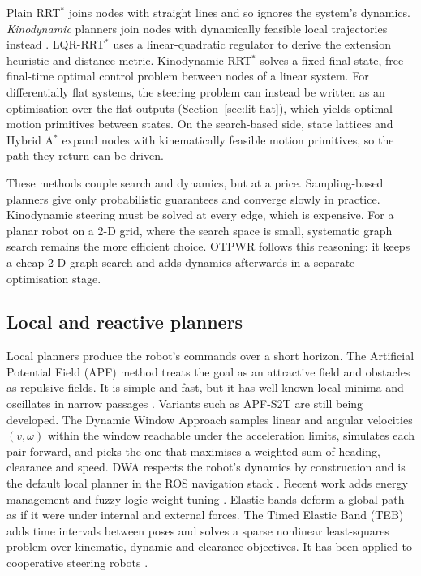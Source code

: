\documentclass[11pt,a4paper]{article}
\begin{document}
Plain RRT$^\ast$ joins nodes with straight lines and so ignores the system's
dynamics. \emph{Kinodynamic} planners join nodes with dynamically feasible
local trajectories instead \citep{lavalle2001randomized}. LQR-RRT$^\ast$
\citep{perez2012lqr} uses a linear-quadratic regulator to derive the
extension heuristic and distance metric. Kinodynamic RRT$^\ast$
\citep{webb2013kinodynamic} solves a fixed-final-state, free-final-time
optimal control problem between nodes of a linear system. For differentially
flat systems, the steering problem can instead be written as an optimisation
over the flat outputs (Section~\ref{sec:lit-flat}), which yields optimal
motion primitives between states. On the search-based side, state lattices
\citep{pivtoraiko2009differentially} and Hybrid A$^\ast$
\citep{dolgov2010path} expand nodes with kinematically feasible motion
primitives, so the path they return can be driven.

These methods couple search and dynamics, but at a price. Sampling-based
planners give only probabilistic guarantees and converge slowly in practice.
Kinodynamic steering must be solved at every edge, which is expensive. For a
planar robot on a 2-D grid, where the search space is small, systematic graph
search remains the more efficient choice. OTPWR follows this reasoning: it
keeps a cheap 2-D graph search and adds dynamics afterwards in a separate
optimisation stage.

\subsection{Local and reactive planners}
\label{sec:lit-local}

Local planners produce the robot's commands over a short horizon. The
Artificial Potential Field (APF) method \citep{khatib1986realtime} treats the
goal as an attractive field and obstacles as repulsive fields. It is simple
and fast, but it has well-known local minima and oscillates in narrow
passages \citep{koren1991potential}. Variants such as APF-S2T
\citep{chen2024apf} are still being developed. The Dynamic Window Approach
\citep{fox1997dwa} samples linear and angular velocities $(v,\omega)$ within
the window reachable under the acceleration limits, simulates each pair
forward, and picks the one that maximises a weighted sum of heading,
clearance and speed. DWA respects the robot's dynamics by construction and
is the default local planner in the ROS navigation stack
\citep{marder2010office}. Recent work adds energy management and fuzzy-logic
weight tuning \citep{yao2024improved}. Elastic bands
\citep{quinlan1993elastic} deform a global path as if it were under internal
and external forces. The Timed Elastic Band (TEB)
\citep{rosmann2012teb,rosmann2017integrated} adds time intervals between
poses and solves a sparse nonlinear least-squares problem over kinematic,
dynamic and clearance objectives. It has been applied to cooperative
steering robots \citep{sun2022solution}.
\end{document}
